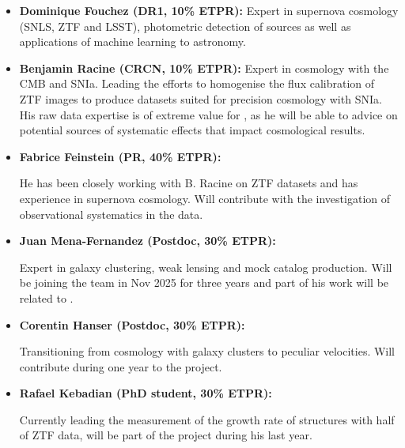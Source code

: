 \begin{itemize}
    \item \textbf{Dominique Fouchez (DR1, 10\% ETPR):} 
        Expert in supernova cosmology (SNLS, ZTF and LSST), 
        photometric detection of sources as well 
        as applications of machine learning to astronomy. 
    
    \item \textbf{Benjamin Racine (CRCN, 10\% ETPR):}
        Expert in cosmology with the CMB and SNIa.  
        Leading the efforts to homogenise the flux calibration of ZTF images 
        to produce datasets suited for precision cosmology with SNIa. 
        His raw data expertise is of extreme value for \projacro, as he will be able to advice on 
        potential sources of systematic effects that impact cosmological results.  
    
    \item \textbf{Fabrice Feinstein (PR, 40\% ETPR):} 
    
        He has been closely working with B. Racine on
        ZTF datasets and has experience in supernova cosmology. Will contribute 
        with the investigation of observational systematics in the data.

    \item \textbf{Juan Mena-Fernandez (Postdoc, 30\% ETPR):}

        Expert in galaxy clustering, weak lensing and mock catalog production. 
        Will be joining the team in Nov 2025 for three years and part of his work will be related to \projacro. 

    \item \textbf{Corentin Hanser (Postdoc, 30\% ETPR):}
    
        Transitioning from cosmology with galaxy clusters to peculiar velocities.  
        Will contribute during one year to the project.

    \item \textbf{Rafael Kebadian (PhD student, 30\% ETPR):}
     
        Currently leading the measurement of the growth rate of structures with half of ZTF data, will be part of the
        project during his last year.  
        

\end{itemize}

